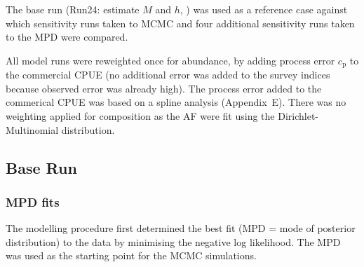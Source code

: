 \documentclass[11pt]{book}
\newcommand{\AppEqn}{Appendix~E}
\begin{document}
The base run (Run24: estimate $M$ and $h$, ) was used as a reference case against which  sensitivity runs taken to MCMC and four additional sensitivity runs taken to the MPD were compared.

All model runs were reweighted once for abundance, by adding process error $c_\text{p}$ to the commercial CPUE (no additional error was added to the survey indices because observed error was already high).
The process error added to the commerical CPUE was based on a spline analysis (\AppEqn).
There was no weighting applied for composition as the AF were fit using the Dirichlet-Multinomial distribution.

\subsection{Base Run}
\subsubsection{MPD fits}\label{sssMPD}


The modelling procedure first determined the best fit (MPD = mode of posterior distribution) to the data by minimising the negative log likelihood.
The MPD was used as the starting point for the MCMC simulations.
\end{document}
